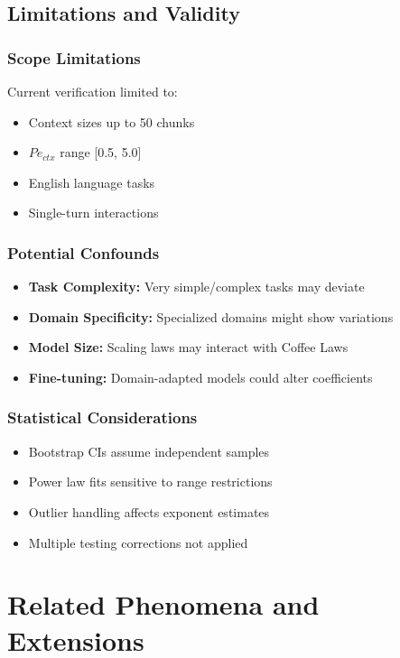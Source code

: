 \documentclass[conference]{IEEEtran}
\begin{document}
\subsection{Limitations and Validity}

\subsubsection{Scope Limitations}

Current verification limited to:
\begin{itemize}
\item Context sizes up to 50 chunks
\item $Pe_{ctx}$ range [0.5, 5.0]
\item English language tasks
\item Single-turn interactions
\end{itemize}

\subsubsection{Potential Confounds}

\begin{itemize}
\item \textbf{Task Complexity:} Very simple/complex tasks may deviate
\item \textbf{Domain Specificity:} Specialized domains might show variations
\item \textbf{Model Size:} Scaling laws may interact with Coffee Laws
\item \textbf{Fine-tuning:} Domain-adapted models could alter coefficients
\end{itemize}

\subsubsection{Statistical Considerations}

\begin{itemize}
\item Bootstrap CIs assume independent samples
\item Power law fits sensitive to range restrictions
\item Outlier handling affects exponent estimates
\item Multiple testing corrections not applied
\end{itemize}

\section{Related Phenomena and Extensions}
\end{document}
